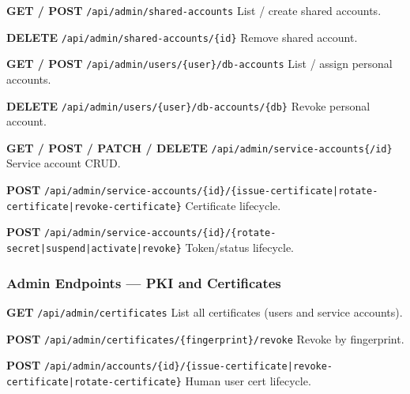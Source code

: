 \begin{tcolorbox}[colback=orange!5, colframe=orange!50, title=\textbf{Shared, Personal, and Service Accounts}]

\textbf{GET / POST} \texttt{/api/admin/shared-accounts} \quad List / create shared accounts.

\vspace{0.2cm}

\textbf{DELETE} \texttt{/api/admin/shared-accounts/\{id\}} \quad Remove shared account.

\vspace{0.2cm}

\textbf{GET / POST} \texttt{/api/admin/users/\{user\}/db-accounts} \quad List / assign personal accounts.

\vspace{0.2cm}

\textbf{DELETE} \texttt{/api/admin/users/\{user\}/db-accounts/\{db\}} \quad Revoke personal account.

\vspace{0.2cm}

\textbf{GET / POST / PATCH / DELETE} \texttt{/api/admin/service-accounts\{/id\}} \quad Service account CRUD.

\vspace{0.2cm}

\textbf{POST} \texttt{/api/admin/service-accounts/\{id\}/\{issue-certificate|rotate-certificate|revoke-certificate\}} \quad Certificate lifecycle.

\vspace{0.2cm}

\textbf{POST} \texttt{/api/admin/service-accounts/\{id\}/\{rotate-secret|suspend|activate|revoke\}} \quad Token/status lifecycle.

\end{tcolorbox}

\subsubsection{Admin Endpoints — PKI and Certificates}

\begin{tcolorbox}[colback=orange!5, colframe=orange!50, title=\textbf{Certificate Management}]

\textbf{GET} \texttt{/api/admin/certificates} \quad List all certificates (users and service accounts).

\vspace{0.2cm}

\textbf{POST} \texttt{/api/admin/certificates/\{fingerprint\}/revoke} \quad Revoke by fingerprint.

\vspace{0.2cm}

\textbf{POST} \texttt{/api/admin/accounts/\{id\}/\{issue-certificate|revoke-certificate|rotate-certificate\}} \quad Human user cert lifecycle.

\end{tcolorbox}

